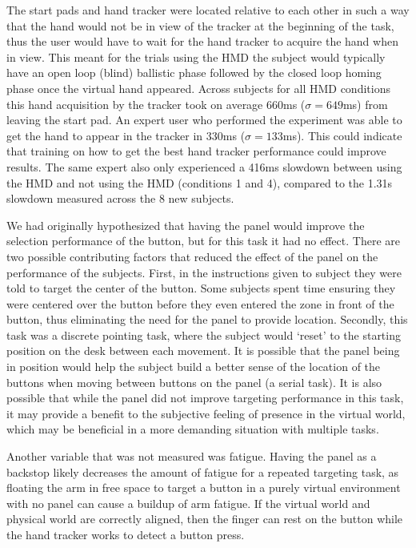 The start pads and hand tracker were located relative to each other in such a way that the hand would not be in view of the tracker at the beginning of the task, thus the user would have to wait for the hand tracker to acquire the hand when in view.
This meant for the trials using the HMD the subject would typically have an open loop (blind) ballistic phase followed by the closed loop homing phase once the virtual hand appeared.
Across subjects for all HMD conditions this hand acquisition by the tracker took on average 660ms ($\sigma = 649$ms) from leaving the start pad.
An expert user who performed the experiment was able to get the hand to appear in the tracker in 330ms ($\sigma = 133$ms).
This could indicate that training on how to get the best hand tracker performance could improve results.
The same expert also only experienced a 416ms slowdown between using the HMD and not using the HMD (conditions 1 and 4), compared to the 1.31s slowdown measured across the 8 new subjects.

We had originally hypothesized that having the panel would improve the selection performance of the button, but for this task it had no effect.
There are two possible contributing factors that reduced the effect of the panel on the performance of the subjects.
First, in the instructions given to subject they were told to target the center of the button.
Some subjects spent time ensuring they were centered over the button before they even entered the zone in front of the button, thus eliminating the need for the panel to provide location.
Secondly, this task was a discrete pointing task, where the subject would `reset' to the starting position on the desk between each movement.
It is possible that the panel being in position would help the subject build a better sense of the location of the buttons when moving between buttons on the panel (a serial task).
It is also possible that while the panel did not improve targeting performance in this task, it may provide a benefit to the subjective feeling of presence in the virtual world, which may be beneficial in a more demanding situation with multiple tasks.

Another variable that was not measured was fatigue.
Having the panel as a backstop likely decreases the amount of fatigue for a repeated targeting task, as floating the arm in free space to target a button in a purely virtual environment with no panel can cause a buildup of arm fatigue.
If the virtual world and physical world are correctly aligned, then the finger can rest on the button while the hand tracker works to detect a button press.

